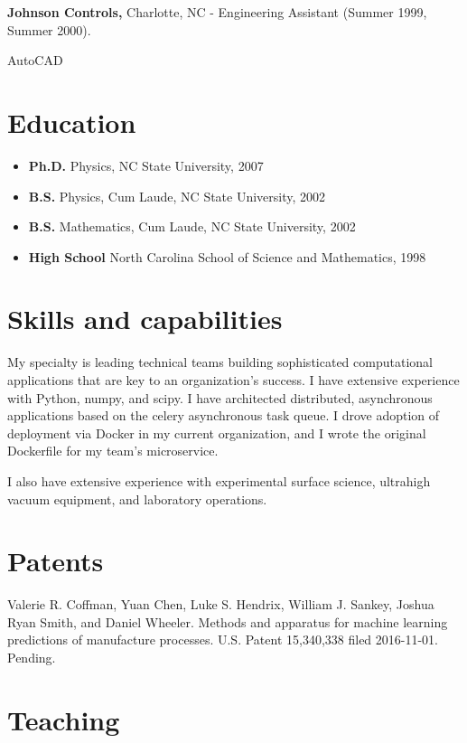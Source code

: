 \textbf{Johnson Controls,} Charlotte, NC - Engineering Assistant (Summer
1999, Summer 2000).

AutoCAD

\section{Education}\label{education}

\begin{itemize}
\tightlist
\item
  \textbf{Ph.D.} Physics, NC State University, 2007
\item
  \textbf{B.S.} Physics, Cum Laude, NC State University, 2002
\item
  \textbf{B.S.} Mathematics, Cum Laude, NC State University, 2002
\item
  \textbf{High School} North Carolina School of Science and Mathematics,
  1998
\end{itemize}

\section{Skills and capabilities}\label{skills-and-capabilities}

My specialty is leading technical teams building sophisticated
computational applications that are key to an organization's success. I
have extensive experience with Python, numpy, and scipy. I have
architected distributed, asynchronous applications based on the celery
asynchronous task queue. I drove adoption of deployment via Docker in my
current organization, and I wrote the original Dockerfile for my team's
microservice.

I also have extensive experience with experimental surface science,
ultrahigh vacuum equipment, and laboratory operations.

\section{Patents}\label{patents}

Valerie R. Coffman, Yuan Chen, Luke S. Hendrix, William J. Sankey,
Joshua Ryan Smith, and Daniel Wheeler. Methods and apparatus for machine
learning predictions of manufacture processes. U.S. Patent 15,340,338
filed 2016-11-01. Pending.

\section{Teaching}\label{teaching}

